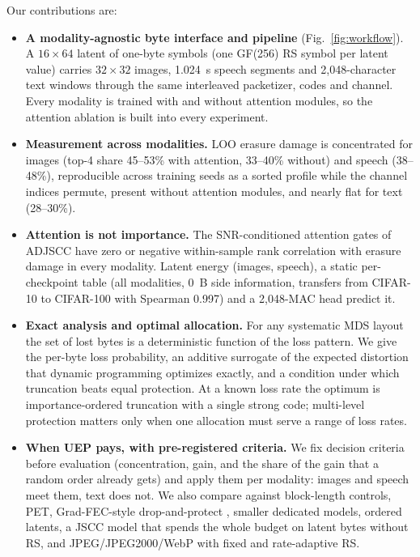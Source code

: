 \documentclass[journal]{IEEEtran}
\begin{document}
Our contributions are:
\begin{itemize}
\item \textbf{A modality-agnostic byte interface and pipeline} (Fig.~\ref{fig:workflow}). A $16\times64$
latent of one-byte symbols (one GF(256) RS symbol per latent value) carries $32\times32$ images, 1.024~s
speech segments and 2,048-character text windows through the same interleaved packetizer, codes and
channel. Every modality is trained with and without attention modules, so the attention ablation is
built into every experiment.
\item \textbf{Measurement across modalities.} LOO erasure damage is concentrated for images (top-4 share
45--53\% with attention, 33--40\% without) and speech (38--48\%), reproducible across training seeds as a sorted profile while the channel
indices permute, present without attention modules, and nearly flat for text (28--30\%).
\item \textbf{Attention is not importance.} The SNR-conditioned attention gates of ADJSCC
\cite{xu2022adjscc} have zero or negative within-sample rank correlation with erasure damage in every
modality. Latent energy (images, speech), a static per-checkpoint table (all modalities, 0~B side
information, transfers from CIFAR-10 to CIFAR-100 with Spearman 0.997) and a 2,048-MAC head predict it.
\item \textbf{Exact analysis and optimal allocation.} For any systematic MDS layout the set of lost bytes
is a deterministic function of the loss pattern. We give the per-byte loss probability, an additive
surrogate of the expected distortion that dynamic programming optimizes exactly, and a condition under
which truncation beats equal protection. At a known loss rate the optimum is importance-ordered
truncation with a single strong code; multi-level protection matters only when one allocation must serve
a range of loss rates.
\item \textbf{When UEP pays, with pre-registered criteria.} We fix decision criteria before evaluation
(concentration, gain, and the share of the gain that a random order already gets) and apply them per
modality: images and speech meet them, text does not. We also compare against block-length controls, PET,
Grad-FEC-style drop-and-protect \cite{uyanik2023gradfec}, smaller dedicated models, ordered latents,
a JSCC model that spends the whole budget on latent bytes without RS, and JPEG/JPEG2000/WebP with fixed
and rate-adaptive RS.
\end{itemize}
\end{document}

